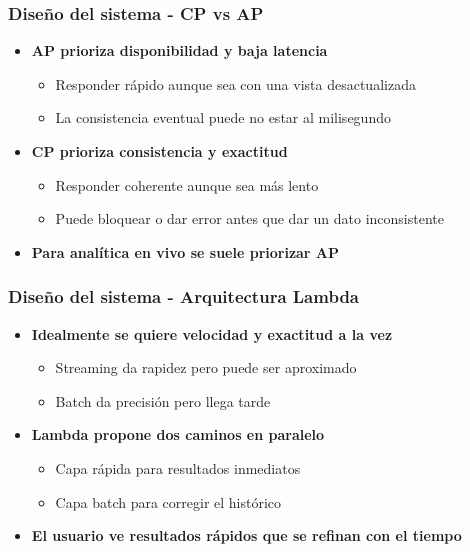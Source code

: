 \documentclass[aspectratio=169]{beamer}
\begin{document}
\begin{frame}
\frametitle{Diseño del sistema - CP vs AP}
\begin{itemize}
  \item \textbf{AP prioriza disponibilidad y baja latencia}
  \begin{itemize}
    \item Responder rápido aunque sea con una vista desactualizada
    \item La consistencia eventual puede no estar al milisegundo
  \end{itemize}

  \vspace{1em}

  \item \textbf{CP prioriza consistencia y exactitud}
  \begin{itemize}
    \item Responder coherente aunque sea más lento
    \item Puede bloquear o dar error antes que dar un dato inconsistente
  \end{itemize}

  \vspace{1em}

  \item \textbf{Para analítica en vivo se suele priorizar AP}
\end{itemize}
\end{frame}

\begin{frame}
\frametitle{Diseño del sistema - Arquitectura Lambda}
  \begin{itemize}
    \item \textbf{Idealmente se quiere velocidad y exactitud a la vez}
    \begin{itemize}
      \item Streaming da rapidez pero puede ser aproximado
      \item Batch da precisión pero llega tarde
    \end{itemize}

    \vspace{1em}

    \item \textbf{Lambda propone dos caminos en paralelo}
    \begin{itemize}
      \item Capa rápida para resultados inmediatos
      \item Capa batch para corregir el histórico
    \end{itemize}

    \vspace{1em}

    \item \textbf{El usuario ve resultados rápidos que se refinan con el tiempo}
  \end{itemize}
\end{frame}
\end{document}
